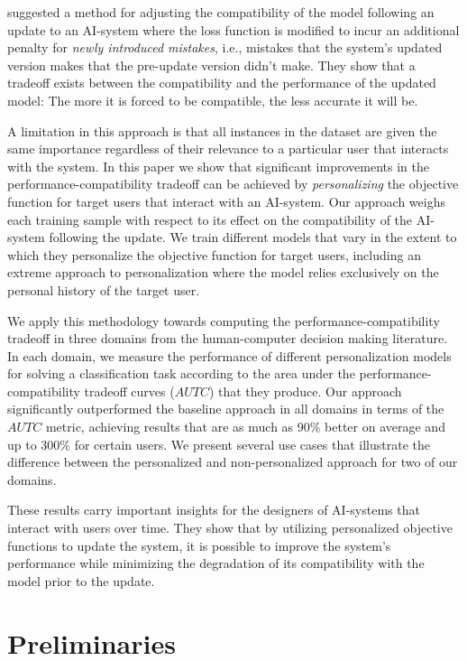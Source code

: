 \documentclass[letterpaper]{article}
\theoremstyle{definition}
\begin{document}
\citet{bansal2019updates} suggested a method for adjusting the compatibility of the model following an update to an AI-system  where the loss function is modified to incur an additional penalty for \textit{newly introduced mistakes}, i.e., mistakes that the system's updated version makes that the pre-update version didn't make. They show that a tradeoff exists between the compatibility and the performance of the updated model: The more it is forced to be compatible, the less accurate it will be.

A limitation in this approach is that all instances in the dataset are given the same importance regardless of their relevance to a particular user that interacts with the system.
In this paper we show that significant improvements in the performance-compatibility tradeoff can be achieved by \emph{personalizing} the objective function for   target users that interact with an AI-system. Our approach
weighs  each training sample with respect to its effect on the compatibility of the AI-system  following the update.
We  train different models that vary in the extent to which they personalize the  objective  function for
target users, including an extreme approach to personalization where the model relies exclusively on the personal history of the target user.

We apply this methodology towards computing the performance-compatibility tradeoff in  three domains from the human-computer decision making literature.
In each domain, we measure  the performance  of different personalization  models for  solving a classification  task according to  the area under the  performance-compatibility tradeoff curves ($AUTC$) that they produce.
Our  approach significantly outperformed the baseline approach \cite{bansal2019updates} in all domains in  terms of the $AUTC$ metric, achieving results that are as much as 90\% better on average and up to 300\% for certain users.
We  present several use cases that illustrate the difference between the personalized and non-personalized approach for two  of our domains.

These results carry important insights  for the designers of  AI-systems that interact with users over time. They  show that  by utilizing personalized objective functions to update the system, it is possible to improve the system's performance while minimizing the degradation of its compatibility with the model prior to the update.

\section{Preliminaries}
\label{sec:adjusting_comp}
\end{document}

